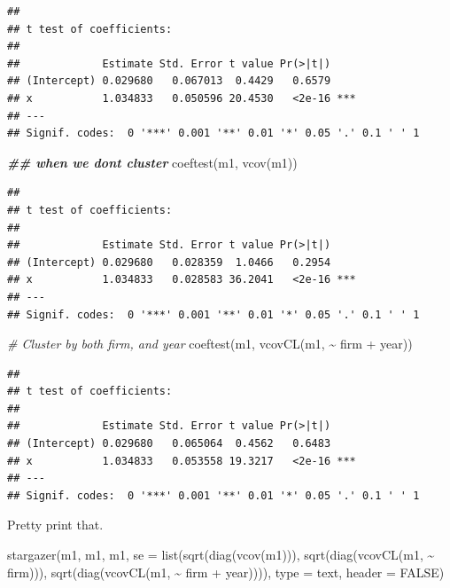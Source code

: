 \documentclass[
]{article}
\newenvironment{Shaded}{\begin{snugshade}}{\end{snugshade}}
\newcommand{\AttributeTok}[1]{\textcolor[rgb]{0.77,0.63,0.00}{#1}}
\newcommand{\CommentTok}[1]{\textcolor[rgb]{0.56,0.35,0.01}{\textit{#1}}}
\newcommand{\ConstantTok}[1]{\textcolor[rgb]{0.00,0.00,0.00}{#1}}
\newcommand{\DocumentationTok}[1]{\textcolor[rgb]{0.56,0.35,0.01}{\textbf{\textit{#1}}}}
\newcommand{\FunctionTok}[1]{\textcolor[rgb]{0.00,0.00,0.00}{#1}}
\newcommand{\NormalTok}[1]{#1}
\newcommand{\SpecialCharTok}[1]{\textcolor[rgb]{0.00,0.00,0.00}{#1}}
\newcommand{\StringTok}[1]{\textcolor[rgb]{0.31,0.60,0.02}{#1}}
\begin{document}
\begin{verbatim}
## 
## t test of coefficients:
## 
##             Estimate Std. Error t value Pr(>|t|)    
## (Intercept) 0.029680   0.067013  0.4429   0.6579    
## x           1.034833   0.050596 20.4530   <2e-16 ***
## ---
## Signif. codes:  0 '***' 0.001 '**' 0.01 '*' 0.05 '.' 0.1 ' ' 1
\end{verbatim}

\begin{Shaded}
\begin{Highlighting}[]
\DocumentationTok{\#\# when we don\textquotesingle{}t cluster}
\FunctionTok{coeftest}\NormalTok{(m1, }\FunctionTok{vcov}\NormalTok{(m1))}
\end{Highlighting}
\end{Shaded}

\begin{verbatim}
## 
## t test of coefficients:
## 
##             Estimate Std. Error t value Pr(>|t|)    
## (Intercept) 0.029680   0.028359  1.0466   0.2954    
## x           1.034833   0.028583 36.2041   <2e-16 ***
## ---
## Signif. codes:  0 '***' 0.001 '**' 0.01 '*' 0.05 '.' 0.1 ' ' 1
\end{verbatim}

\begin{Shaded}
\begin{Highlighting}[]
\CommentTok{\# Cluster by both firm, and year}
\FunctionTok{coeftest}\NormalTok{(m1, }\FunctionTok{vcovCL}\NormalTok{(m1, }\SpecialCharTok{\textasciitilde{}}\NormalTok{ firm }\SpecialCharTok{+}\NormalTok{ year))}
\end{Highlighting}
\end{Shaded}

\begin{verbatim}
## 
## t test of coefficients:
## 
##             Estimate Std. Error t value Pr(>|t|)    
## (Intercept) 0.029680   0.065064  0.4562   0.6483    
## x           1.034833   0.053558 19.3217   <2e-16 ***
## ---
## Signif. codes:  0 '***' 0.001 '**' 0.01 '*' 0.05 '.' 0.1 ' ' 1
\end{verbatim}

Pretty print that.

\begin{Shaded}
\begin{Highlighting}[]
\FunctionTok{stargazer}\NormalTok{(m1, m1, m1,}
          \AttributeTok{se =} \FunctionTok{list}\NormalTok{(}\FunctionTok{sqrt}\NormalTok{(}\FunctionTok{diag}\NormalTok{(}\FunctionTok{vcov}\NormalTok{(m1))), }
                    \FunctionTok{sqrt}\NormalTok{(}\FunctionTok{diag}\NormalTok{(}\FunctionTok{vcovCL}\NormalTok{(m1, }\SpecialCharTok{\textasciitilde{}}\NormalTok{ firm))), }
                    \FunctionTok{sqrt}\NormalTok{(}\FunctionTok{diag}\NormalTok{(}\FunctionTok{vcovCL}\NormalTok{(m1, }\SpecialCharTok{\textasciitilde{}}\NormalTok{ firm }\SpecialCharTok{+}\NormalTok{ year)))),}
          \AttributeTok{type =} \StringTok{\textquotesingle{}text\textquotesingle{}}\NormalTok{,}
          \AttributeTok{header =} \ConstantTok{FALSE}\NormalTok{)}
\end{Highlighting}
\end{Shaded}
\end{document}
